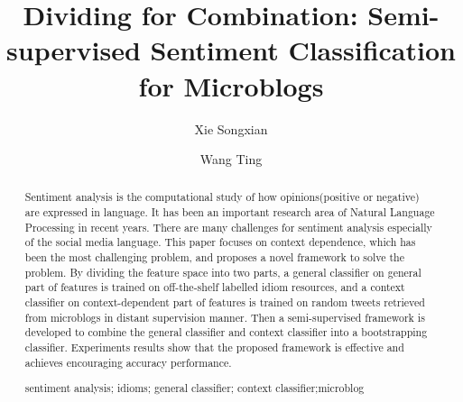 \documentclass{llncs}
\newcommand{\keywords}[1]{\par\addvspace\baselineskip
\noindent\keywordname\enspace\ignorespaces#1}
\begin{document}
\mainmatter  %

\title{Dividing for Combination: Semi-supervised Sentiment Classification for Microblogs}
%
\author{Xie Songxian%
\and Wang Ting}
%

\maketitle

\begin{abstract}
Sentiment analysis is the computational study of how opinions(positive or negative) are expressed in language. It has been an important research area of Natural Language Processing in recent years.
There are many challenges for sentiment analysis especially of the social media language. 
This paper focuses on context dependence, which has been the most challenging problem, and proposes a novel framework to solve the problem.
By dividing the feature space into two parts, a general classifier on general part of features is trained on off-the-shelf labelled idiom resources, and a context classifier on context-dependent part of features is trained on random tweets retrieved from microblogs in distant supervision manner. 
Then a semi-supervised framework is developed to combine the general classifier and context classifier into a bootstrapping classifier. 
Experiments results show that the proposed framework is effective and achieves encouraging accuracy performance. 
\keywords{sentiment analysis; idioms; general classifier; context classifier;microblog}
\end{abstract}
\end{document}
